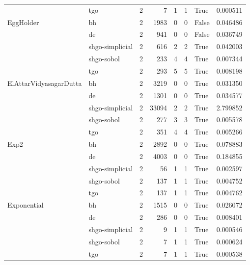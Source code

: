 \begin{longtable}{llrrrrlr}
         & tgo &     2 &        7 &      1 &       1 &    True &    0.000511 \\
EggHolder & bh &     2 &     1983 &      0 &       0 &   False &    0.046486 \\
         & de &     2 &      941 &      0 &       0 &   False &    0.036749 \\
         & shgo-simplicial &     2 &      616 &      2 &       2 &    True &    0.042003 \\
         & shgo-sobol &     2 &      233 &      4 &       4 &    True &    0.007344 \\
         & tgo &     2 &      293 &      5 &       5 &    True &    0.008198 \\
ElAttarVidyasagarDutta & bh &     2 &     3219 &      0 &       0 &    True &    0.031350 \\
         & de &     2 &     1301 &      0 &       0 &    True &    0.034577 \\
         & shgo-simplicial &     2 &    33094 &      2 &       2 &    True &    2.799852 \\
         & shgo-sobol &     2 &      277 &      3 &       3 &    True &    0.005578 \\
         & tgo &     2 &      351 &      4 &       4 &    True &    0.005266 \\
Exp2 & bh &     2 &     2892 &      0 &       0 &    True &    0.078883 \\
         & de &     2 &     4003 &      0 &       0 &    True &    0.184855 \\
         & shgo-simplicial &     2 &       56 &      1 &       1 &    True &    0.002597 \\
         & shgo-sobol &     2 &      137 &      1 &       1 &    True &    0.004752 \\
         & tgo &     2 &      137 &      1 &       1 &    True &    0.004762 \\
Exponential & bh &     2 &     1515 &      0 &       0 &    True &    0.026072 \\
         & de &     2 &      286 &      0 &       0 &    True &    0.008401 \\
         & shgo-simplicial &     2 &        9 &      1 &       1 &    True &    0.000546 \\
         & shgo-sobol &     2 &        7 &      1 &       1 &    True &    0.000624 \\
         & tgo &     2 &        7 &      1 &       1 &    True &    0.000538 \\

\end{longtable}
